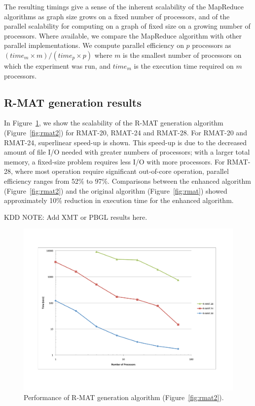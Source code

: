 The resulting timings give a sense of the inherent scalability of the
MapReduce algorithms as graph size grows on a fixed number of
processors, and of the parallel scalability for computing on a graph
of fixed size on a growing number of processors.  Where available, we
compare the MapReduce algorithm with other parallel implementations.
We compute parallel efficiency on $p$ processors
as $({time}_{m} \times m) / ({time}_p \times p)$
where $m$ is the smallest number of processors on which the experiment
was run, and ${time}_m$ is the execution time required on $m$ processors.

\subsection{R-MAT generation results}

In Figure~\ref{f:rmat}, we show the scalability of the R-MAT generation 
algorithm (Figure~\ref{fig:rmat2}) for RMAT-20, RMAT-24 and RMAT-28.  For
RMAT-20 and RMAT-24, superlinear speed-up is shown.  This speed-up is due
to the decreased amount of file I/O needed with greater numbers of 
processors; with a larger total memory, a fixed-size problem requires
less I/O with more processors.  For RMAT-28, where most operation require
significant out-of-core operation, parallel efficiency ranges from 52\% to
97\%.  Comparisons between the enhanced algorithm (Figure~\ref{fig:rmat2}) and
the original algorithm (Figure~\ref{fig:rmat}) showed approximately 
10\% reduction in execution time for the enhanced algorithm.

KDD NOTE:  Add XMT or PBGL results here.

\begin{figure}[htb]
\includegraphics[width=\textwidth]{fig_rmat.pdf}
\caption{Performance of R-MAT generation algorithm (Figure~\ref{fig:rmat2}).}
\label{f:rmat}
\end{figure}

